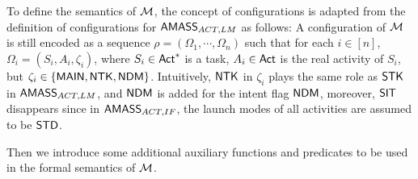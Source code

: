 To define the semantics of ${\mathcal{M} }$, the concept of configurations is adapted from the definition of configurations for  $\textsf{AMASS}_{ACT,LM}$ as follows: 
A configuration of ${\mathcal{M} }$ is 
still encoded as a sequence
$\rho=(\Omega_1,\cdots,\Omega_n)$ such that for each $i \in [n]$, $\Omega_i = (S_i, A_i, \zeta_i)$, where $S_i \in {\sf Act}^*$ is a task, $A_i \in {\sf Act}$ is the real activity of $S_i$, but $\zeta_i \in \{{\sf MAIN}, {\sf NTK}, {\sf NDM}\}$. Intuitively, 
${\sf NTK}$ in $\zeta_i$ plays the same role as ${\sf STK}$ in $\textsf{AMASS}_{ACT,LM}$, and ${\sf NDM}$ is added for the intent flag ${\sf NDM}$, moreover, ${\sf SIT}$ disappears since in $\textsf{AMASS}_{ACT,IF}$, the launch modes of all activities are assumed to be ${\sf STD}$.


Then we introduce some additional auxiliary functions and predicates to be used in the formal semantics of ${\mathcal{M} }$.

